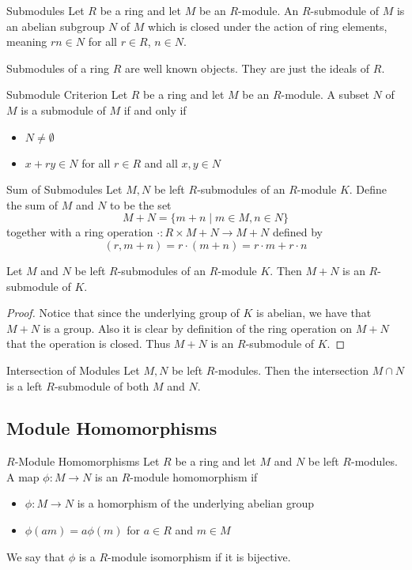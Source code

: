 \documentclass[a4paper]{article}
\begin{document}
\begin{defn}{Submodules}{} Let $R$ be a ring and let $M$ be an $R$-module. An $R$-submodule of $M$ is an abelian subgroup $N$ of $M$ which is closed under the action of ring elements, meaning $rn\in N$ for all $r\in R$, $n\in N$. 
\end{defn}

Submodules of a ring $R$ are well known objects. They are just the ideals of $R$. 

\begin{prp}{Submodule Criterion}{} Let $R$ be a ring and let $M$ be an $R$-module. A subset $N$ of $M$ is a submodule of $M$ if and only if
\begin{itemize}
\item $N\neq\emptyset$
\item $x+ry\in N$ for all $r\in R$ and all $x,y\in N$
\end{itemize}
\end{prp}

\begin{defn}{Sum of Submodules}{} Let $M,N$ be left $R$-submodules of an $R$-module $K$. Define the sum of $M$ and $N$ to be the set $$M+N=\{m+n\;|\;m\in M,n\in N\}$$ together with a ring operation $\cdot:R\times M+N\to M+N$ defined by $$(r,m+n)=r\cdot(m+n)=r\cdot m+r\cdot n$$
\end{defn}

\begin{lmm}{}{} Let $M$ and $N$ be left $R$-submodules of an $R$-module $K$. Then $M+N$ is an $R$-submodule of $K$. \tcbline
\begin{proof}
Notice that since the underlying group of $K$ is abelian, we have that $M+N$ is a group. Also it is clear by definition of the ring operation on $M+N$ that the operation is closed. Thus $M+N$ is an $R$-submodule of $K$. 
\end{proof}
\end{lmm}

\begin{prp}{Intersection of Modules}{} Let $M,N$ be left $R$-modules. Then the intersection $M\cap N$ is a left $R$-submodule of both $M$ and $N$. 
\end{prp}

\subsection{Module Homomorphisms}
\begin{defn}{$R$-Module Homomorphisms}{} Let $R$ be a ring and let $M$ and $N$ be left $R$-modules. A map $\phi:M\to N$ is an $R$-module homomorphism if 
\begin{itemize}
\item $\phi:M\to N$ is a homorphism of the underlying abelian group
\item $\phi(am)=a\phi(m)$ for $a\in R$ and $m\in M$
\end{itemize}
We say that $\phi$ is a $R$-module isomorphism if it is bijective. 
\end{defn}
\end{document}
